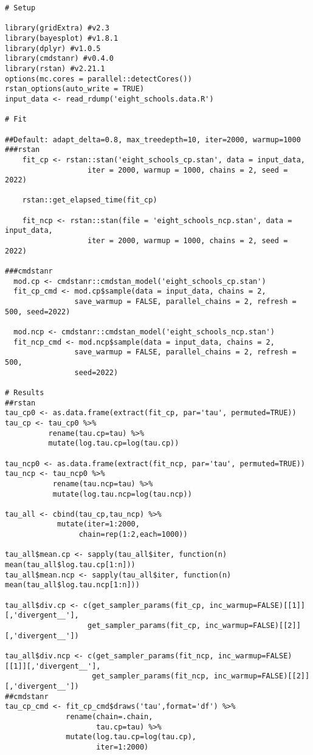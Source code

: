 \begin{verbatim}
# Setup

library(gridExtra) #v2.3
library(bayesplot) #v1.8.1
library(dplyr) #v1.0.5
library(cmdstanr) #v0.4.0
library(rstan) #v2.21.1
options(mc.cores = parallel::detectCores())
rstan_options(auto_write = TRUE)
input_data <- read_rdump('eight_schools.data.R')

# Fit

##Default: adapt_delta=0.8, max_treedepth=10, iter=2000, warmup=1000
###rstan
    fit_cp <- rstan::stan('eight_schools_cp.stan', data = input_data,
                   iter = 2000, warmup = 1000, chains = 2, seed = 2022)
                   
    rstan::get_elapsed_time(fit_cp)
    
    fit_ncp <- rstan::stan(file = 'eight_schools_ncp.stan', data = input_data,
                   iter = 2000, warmup = 1000, chains = 2, seed = 2022)

###cmdstanr
  mod.cp <- cmdstanr::cmdstan_model('eight_schools_cp.stan')
  fit_cp_cmd <- mod.cp$sample(data = input_data, chains = 2,
                save_warmup = FALSE, parallel_chains = 2, refresh = 500, seed=2022)

  mod.ncp <- cmdstanr::cmdstan_model('eight_schools_ncp.stan')
  fit_ncp_cmd <- mod.ncp$sample(data = input_data, chains = 2,
                save_warmup = FALSE, parallel_chains = 2, refresh = 500,
                seed=2022)

# Results
##rstan
tau_cp0 <- as.data.frame(extract(fit_cp, par='tau', permuted=TRUE))
tau_cp <- tau_cp0 %>% 
          rename(tau.cp=tau) %>% 
          mutate(log.tau.cp=log(tau.cp))

tau_ncp0 <- as.data.frame(extract(fit_ncp, par='tau', permuted=TRUE))
tau_ncp <- tau_ncp0 %>% 
           rename(tau.ncp=tau) %>% 
           mutate(log.tau.ncp=log(tau.ncp))

tau_all <- cbind(tau_cp,tau_ncp) %>% 
            mutate(iter=1:2000,
                 chain=rep(1:2,each=1000))

tau_all$mean.cp <- sapply(tau_all$iter, function(n) mean(tau_all$log.tau.cp[1:n]))
tau_all$mean.ncp <- sapply(tau_all$iter, function(n) mean(tau_all$log.tau.ncp[1:n]))

tau_all$div.cp <- c(get_sampler_params(fit_cp, inc_warmup=FALSE)[[1]][,'divergent__'],
                   get_sampler_params(fit_cp, inc_warmup=FALSE)[[2]][,'divergent__'])

tau_all$div.ncp <- c(get_sampler_params(fit_ncp, inc_warmup=FALSE)[[1]][,'divergent__'],
                    get_sampler_params(fit_ncp, inc_warmup=FALSE)[[2]][,'divergent__'])
##cmdstanr
tau_cp_cmd <- fit_cp_cmd$draws('tau',format='df') %>% 
              rename(chain=.chain,
                     tau.cp=tau) %>% 
              mutate(log.tau.cp=log(tau.cp),
                     iter=1:2000)


\end{verbatim}
